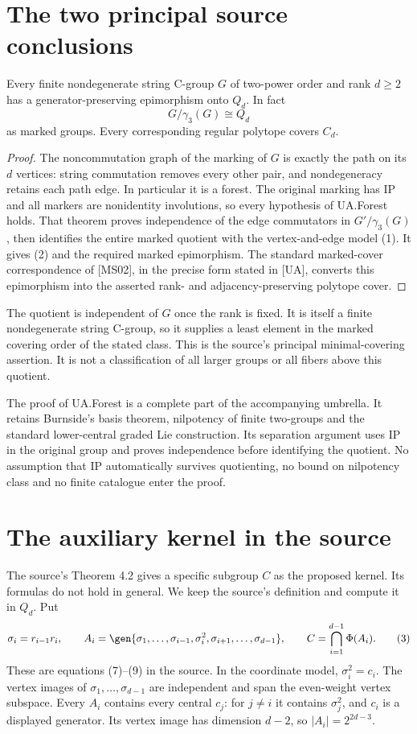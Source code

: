 \section{The two principal source conclusions}
\begin{theorem}
Every finite nondegenerate string C-group $G$ of two-power order and rank
$d\ge2$ has a generator-preserving epimorphism onto $Q_d$. In fact
\[
 G/\gamma_3(G)\cong Q_d                                  \tag{2}
\]
as marked groups. Every corresponding regular polytope covers $C_d$.
\end{theorem}
\begin{proof}
The noncommutation graph of the marking of $G$ is exactly the path on its
$d$ vertices: string commutation removes every other pair, and
nondegeneracy retains each path edge. In particular it is a forest. The
original marking has IP and all markers are nonidentity involutions, so
every hypothesis of UA.Forest holds. That theorem proves independence of
the edge commutators in $G'/\gamma_3(G)$, then identifies the entire
marked quotient with the vertex-and-edge model (1). It gives (2) and the
required marked epimorphism. The standard marked-cover correspondence
of [MS02], in the precise form stated in [UA], converts this epimorphism
into the asserted rank- and adjacency-preserving polytope cover.
\end{proof}

The quotient is independent of $G$ once the rank is fixed. It is itself a
finite nondegenerate string C-group, so it supplies a least element in the
marked covering order of the stated class. This is the source's principal
minimal-covering assertion. It is not a classification of all larger groups
or all fibers above this quotient.

The proof of UA.Forest is a complete part of the accompanying umbrella.
It retains Burnside's basis theorem, nilpotency of finite two-groups and
the standard lower-central graded Lie construction. Its separation argument
uses IP in the original group and proves independence before identifying
the quotient. No assumption that IP automatically survives quotienting,
no bound on nilpotency class and no finite catalogue enter the proof.

\section{The auxiliary kernel in the source}
The source's Theorem 4.2 gives a specific subgroup $C$ as the proposed
kernel. Its formulas do not hold in general. We keep the source's
definition and compute it in $Q_d$.
Put
\[
 \sigma_i=r_{i-1}r_i,\qquad
 A_i=\gen{\sigma_1,\ldots,\sigma_{i-1},\sigma_i^2,
                    \sigma_{i+1},\ldots,\sigma_{d-1}},
 \qquad C=\bigcap_{i=1}^{d-1}\Phi(A_i).                    \tag{3}
\]
These are equations (7)--(9) in the source. In the coordinate model,
$\sigma_i^2=c_i$. The vertex images of $\sigma_1,\ldots,\sigma_{d-1}$
are independent and span the even-weight vertex subspace. Every $A_i$
contains every central $c_j$: for $j\ne i$ it contains $\sigma_j^2$,
and $c_i$ is a displayed generator. Its vertex image has dimension $d-2$,
so $|A_i|=2^{2d-3}$.

